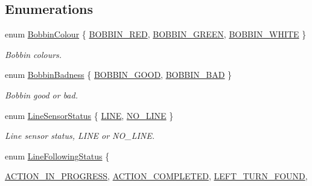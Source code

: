 \subsection*{Enumerations}
\begin{DoxyCompactItemize}
\item 
enum \hyperlink{namespaceIDP_a6efd2cca14c0dae1c6458714ce0218df}{BobbinColour} \{ \hyperlink{namespaceIDP_a6efd2cca14c0dae1c6458714ce0218dfa1bbb59488c1d089eefb9b54146bcdb26}{BOBBIN\_\-RED}, 
\hyperlink{namespaceIDP_a6efd2cca14c0dae1c6458714ce0218dfa047d7c5fcd5669f1a819d05fb5319f0b}{BOBBIN\_\-GREEN}, 
\hyperlink{namespaceIDP_a6efd2cca14c0dae1c6458714ce0218dfa8f427bfb1c335650a7ada595e1607d00}{BOBBIN\_\-WHITE}
 \}
\begin{DoxyCompactList}\small\item\em Bobbin colours. \item\end{DoxyCompactList}\item 
enum \hyperlink{namespaceIDP_adf12b2c1e1c228810b18c34a3c88c32d}{BobbinBadness} \{ \hyperlink{namespaceIDP_adf12b2c1e1c228810b18c34a3c88c32dafdc1b8b5a9d849fd99ac2ae438b632dd}{BOBBIN\_\-GOOD}, 
\hyperlink{namespaceIDP_adf12b2c1e1c228810b18c34a3c88c32da6cb4993a316e9d4dc9836d3d990fd0f6}{BOBBIN\_\-BAD}
 \}
\begin{DoxyCompactList}\small\item\em Bobbin good or bad. \item\end{DoxyCompactList}\item 
enum \hyperlink{namespaceIDP_afc3b1d4cbb313bfc854f49d6f23b25f7}{LineSensorStatus} \{ \hyperlink{namespaceIDP_afc3b1d4cbb313bfc854f49d6f23b25f7ab8f6b528c0b2fd3edfdd6463cc6a2fd2}{LINE}, 
\hyperlink{namespaceIDP_afc3b1d4cbb313bfc854f49d6f23b25f7a8f85d4834fc4519df3f2053201d497d1}{NO\_\-LINE}
 \}
\begin{DoxyCompactList}\small\item\em Line sensor status, LINE or NO\_\-LINE. \item\end{DoxyCompactList}\item 
enum \hyperlink{namespaceIDP_a5993bdfdd901fc5521c8df42dca43bd0}{LineFollowingStatus} \{ \par
\hyperlink{namespaceIDP_a5993bdfdd901fc5521c8df42dca43bd0a392b1fde04c7c0a442405be80f874159}{ACTION\_\-IN\_\-PROGRESS}, 
\hyperlink{namespaceIDP_a5993bdfdd901fc5521c8df42dca43bd0a1347f71adefd32a09a46af0c452f2884}{ACTION\_\-COMPLETED}, 
\hyperlink{namespaceIDP_a5993bdfdd901fc5521c8df42dca43bd0a38cd4116cdddd4aa99a78dd5c3b37ed6}{LEFT\_\-TURN\_\-FOUND}, 

\end{DoxyCompactItemize}

